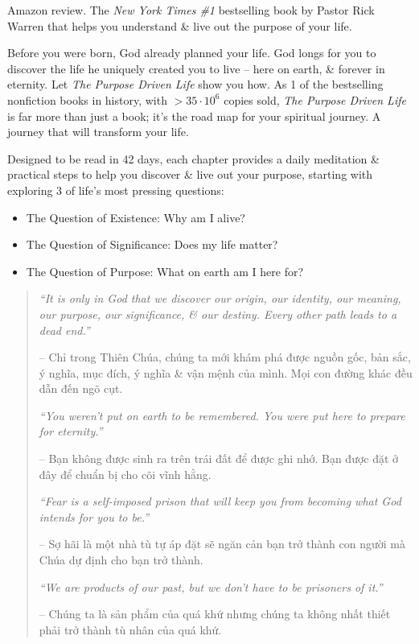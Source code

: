 \documentclass{article}
\begin{document}
\begin{enumerate}
	{\sf Amazon review.} The {\it New York Times \#1} bestselling book by Pastor {\sc Rick Warren} that helps you understand \& live out the purpose of your life.
	
	Before you were born, God already planned your life. God longs for you to discover the life he uniquely created you to live -- here on earth, \& forever in eternity. Let {\it The Purpose Driven Life} show you how. As 1 of the bestselling nonfiction books in history, with $> 35\cdot10^6$ copies sold, {\it The Purpose Driven Life} is far more than just a book; it's the road map for your spiritual journey. A journey that will transform your life.
	
	Designed to be read in 42 days, each chapter provides a daily meditation \& practical steps to help you discover \& live out your purpose, starting with exploring 3 of life's most pressing questions:
	\begin{itemize}
		\item The Question of Existence: Why am I alive?
		\item The Question of Significance: Does my life matter?
		\item The Question of Purpose: What on earth am I here for?
	\end{itemize}
	\begin{quotation}
		{\it``It is only in God that we discover our origin, our identity, our meaning, our purpose, our significance, \& our destiny. Every other path leads to a dead end.''}
		
		-- Chỉ trong Thiên Chúa, chúng ta mới khám phá được nguồn gốc, bản sắc, ý nghĩa, mục đích, ý nghĩa \& vận mệnh của mình. Mọi con đường khác đều dẫn đến ngõ cụt.
		
		{\it``You weren't put on earth to be remembered. You were put here to prepare for eternity.''}
		
		-- Bạn không được sinh ra trên trái đất để được ghi nhớ. Bạn được đặt ở đây để chuẩn bị cho cõi vĩnh hằng.
		
		{\it``Fear is a self-imposed prison that will keep you from becoming what God intends for you to be.''}
		
		-- Sợ hãi là một nhà tù tự áp đặt sẽ ngăn cản bạn trở thành con người mà Chúa dự định cho bạn trở thành.
		
		{\it``We are products of our past, but we don't have to be prisoners of it.''}
		
		-- Chúng ta là sản phẩm của quá khứ nhưng chúng ta không nhất thiết phải trở thành tù nhân của quá khứ.
		

\end{quotation}
\end{enumerate}
\end{document}
